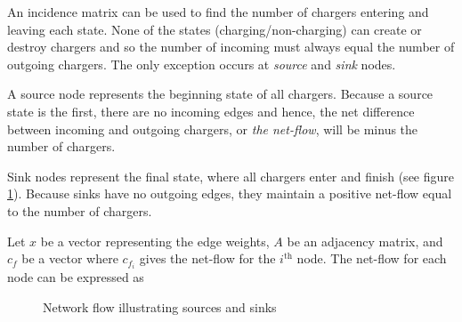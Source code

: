 \par  An incidence matrix can be used to find the number of chargers entering and leaving each state. None of the states (charging/non-charging) can create or destroy chargers and so the number of incoming must always equal the number of outgoing chargers. The only exception occurs at \textit{source} and \textit{sink} nodes.
\par A source node represents the beginning state of all chargers.  Because a source state is the first, there are no incoming edges and hence, the net difference between incoming and outgoing chargers, or \textit{the net-flow}, will be minus the number of chargers. 
\par Sink nodes represent the final state, where all chargers enter and finish (see figure \ref{fig:sourceSink}). Because sinks have no outgoing edges, they maintain a positive net-flow equal to the number of chargers. 
\par Let $x$ be a vector representing the edge weights, $A$ be an adjacency matrix, and $c_f$ be a vector where $c_{f_i}$ gives the net-flow for the $i^{\text{th}}$ node. The net-flow for each node can be expressed as 

\begin{figure}
	\centering
{}
	\caption{Network flow illustrating sources and sinks}
	\label{fig:sourceSink} 
\end{figure} 

